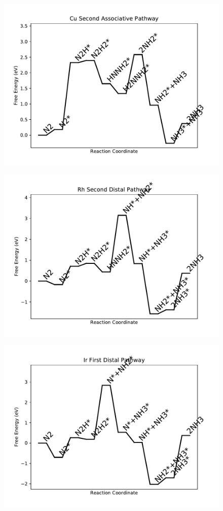 \begin{figure}
\centering
\includegraphics[width=0.8\linewidth]{data/plots/Cu_associative_2.pdf}
\end{figure}

\begin{figure}
\centering
\includegraphics[width=0.8\linewidth]{data/plots/Rh_distal_2.pdf}
\end{figure}

\begin{figure}
\centering
\includegraphics[width=0.8\linewidth]{data/plots/Ir_distal_1.pdf}
\end{figure}

